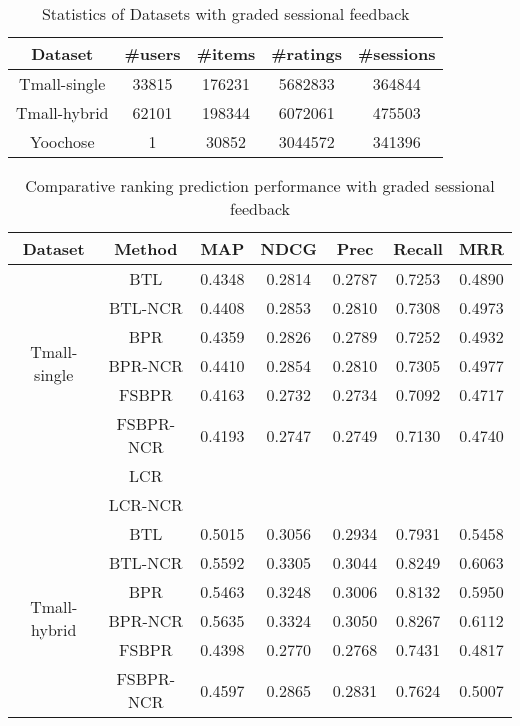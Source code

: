 \documentclass[letterpaper]{article} %
\begin{document}
\begin{table}[htp]
\caption{Statistics of Datasets with graded sessional feedback}
\begin{center}
\begin{tabular}{|c|c|c|c|c|}
\hline
Dataset & \#users & \#items & \#ratings & \#sessions \\\hline
Tmall-single &33815 &176231 &5682833 &364844 \\\hline
Tmall-hybrid &62101 &198344 &6072061 &475503 \\\hline
Yoochose &1 &30852 &3044572 &341396 \\\hline
\end{tabular}
\end{center}
\label{tab:datasets}
\end{table}%

\begin{table}[htp]
\tiny
\caption{Comparative ranking prediction performance with graded sessional feedback}
\begin{center}
\begin{tabular}{|c|c|c|c|c|c|c|}
\hline
Dataset & Method & MAP & NDCG & Prec & Recall & MRR \\\hline
\multirow{6}{*}{Tmall-single} & BTL &0.4348 &0.2814 &0.2787 &0.7253 &0.4890 \\\cline{2-7}
 & BTL-NCR &0.4408 &0.2853 &0.2810 &0.7308 &0.4973 \\\cline{2-7}
 & BPR &0.4359 &0.2826 &0.2789 &0.7252 &0.4932 \\\cline{2-7}
 & BPR-NCR &0.4410 &0.2854 &0.2810 &0.7305 &0.4977 \\\cline{2-7}
 & FSBPR &0.4163 &0.2732 &0.2734 &0.7092 &0.4717 \\\cline{2-7}
  & FSBPR-NCR &0.4193 &0.2747 &0.2749 &0.7130 &0.4740 \\\cline{2-7}
   & LCR & & & & & \\\cline{2-7}
 & LCR-NCR & & & & & \\\hline
\multirow{6}{*}{Tmall-hybrid} & BTL &0.5015 &0.3056 &0.2934 &0.7931 &0.5458 \\\cline{2-7}
 & BTL-NCR &0.5592 &0.3305 &0.3044 &0.8249 &0.6063 \\\cline{2-7}
 & BPR &0.5463 &0.3248 &0.3006 &0.8132 &0.5950 \\\cline{2-7}
 & BPR-NCR &0.5635 &0.3324 &0.3050 &0.8267 &0.6112 \\\cline{2-7}
 & FSBPR &0.4398 &0.2770 &0.2768 &0.7431 &0.4817 \\\cline{2-7}
  & FSBPR-NCR &0.4597 &0.2865 &0.2831 &0.7624 &0.5007 \\\cline{2-7}

\end{tabular}
\end{center}
\end{table}
\end{document}
